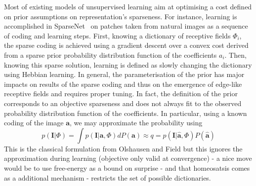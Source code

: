 \documentclass[a4paper, 11pt, draft]{article} %
\newcommand{\coef}{\mathbf{a}} %
\newcommand{\image}{\mathbf{I}} %
\newcommand{\dico}{\Phi} %
\begin{document}
Most of existing models of unsupervised learning aim at optimising a cost defined on prior assumptions on representation's sparseness. For instance, learning is accomplished in {\sc SparseNet}~\citep{Olshausen97} on patches taken from natural images as a sequence of coding and learning steps. First, knowing a dictionary of receptive fields $\dico_i$, the sparse coding is achieved using a gradient descent over a convex cost derived from a sparse prior probability distribution function of the coefficients $a_i$. Then, knowing this sparse solution, learning is defined as slowly changing the dictionary using Hebbian learning. In general, the parameterisation of the prior has major impacts on results of the sparse coding and thus on the emergence of edge-like receptive fields and requires proper tuning. In fact, the definition of the prior corresponds to an objective sparseness and does not always fit to the observed probability distribution function of the coefficients. 
In particular, using a known coding of the image $\coef$, we may approximate the probability using
$$ p(\image | \dico ) = \int  p(\image | \coef, \dico ) dP(\coef) \approx q = p(\image | \hat{\coef}, \dico ) P(\hat{\coef}) $$
This is the classical formulation from Olshausen and Field but this ignores the approximation during learning (objective only valid at convergence) - a nice move would be to use free-energy as a bound on surprise - and that homeosatsis comes as a additional mechanism - restricts the set of possible dictionaries.




%
%
%
\end{document}
